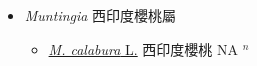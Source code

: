 
  \begin{itemize}
 \item[] \textit{Muntingia} 西印度櫻桃屬
                    
  \begin{itemize}
        \item[] \href{http://www.theplantlist.org/tpl1.1/search?q=Muntingia+calabura}{\textit{M. calabura} L.}   西印度櫻桃 NA $^n$
  \end{itemize}
  \end{itemize}
